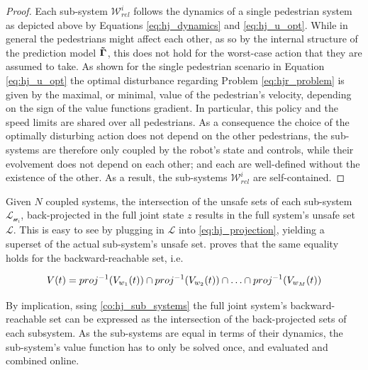 \begin{proof}
Each sub-system $\mathcal{W}_{rel}^i$ follows the dynamics of a single pedestrian system as depicted above by Equations \ref{eq:hj_dynamics} and \ref{eq:hj_u_opt}. While in general the pedestrians might affect each other, as so by the internal structure of the prediction model $\distmodel[]$, this does not hold for the worst-case action that they are assumed to take. As shown for the single pedestrian scenario in Equation \ref{eq:hj_u_opt} the optimal disturbance regarding Problem \ref{eq:hjr_problem} is given by the maximal, or minimal, value of the pedestrian's velocity, depending on the sign of the value functions gradient. In particular, this policy and the speed limits are shared over all pedestrians. As a consequence the choice of the optimally disturbing action does not depend on the other pedestrians, the sub-systems are therefore only coupled by the robot's state and controls, while their evolvement does not depend on each other; and each are well-defined without the existence of the other. As a result, the sub-systems $\mathcal{W}_{rel}^i$ are self-contained.
\end{proof}

Given $N$ coupled systems, the intersection of the unsafe sets of each sub-system $\mathcal{L}_{\mathcal{w}_i}$, back-projected in the full joint state $z$ results in the full system's unsafe set $\mathcal{L}$. This is easy to see by plugging in $\mathcal{L}$ into \ref{eq:hj_projection}, yielding a superset of the actual sub-system's unsafe set. \cite{Chen2016a} proves that the same equality holds for the backward-reachable set, i.e. 

\begin{equation}
V(t) = proj^{-1}(V_{w_1}(t)) \cap proj^{-1}(V_{w_2}(t)) \cap \hdots \cap proj^{-1}(V_{w_M}(t))
\end{equation}

By implication, ssing \ref{co:hj_sub_systems} the full joint system's backward-reachable set can be expressed as the intersection of the back-projected sets of each subsystem. As the sub-systems are equal in terms of their dynamics, the sub-system's value function has to only be solved once, and evaluated and combined online.
